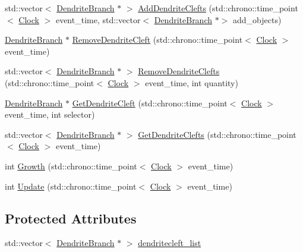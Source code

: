 \begin{DoxyCompactItemize}
\item 
std\+::vector$<$ \hyperlink{class_dendrite_branch}{Dendrite\+Branch} $\ast$ $>$ \hyperlink{class_dendrite_branch_a2ddeff41db805e414c994ac169cbcf4b}{Add\+Dendrite\+Clefts} (std\+::chrono\+::time\+\_\+point$<$ \hyperlink{universe_8h_a0ef8d951d1ca5ab3cfaf7ab4c7a6fd80}{Clock} $>$ event\+\_\+time, std\+::vector$<$ \hyperlink{class_dendrite_branch}{Dendrite\+Branch} $\ast$$>$ add\+\_\+objects)
\item 
\hyperlink{class_dendrite_branch}{Dendrite\+Branch} $\ast$ \hyperlink{class_dendrite_branch_afaca221cb4bba98e56f11b0f9e6370b5}{Remove\+Dendrite\+Cleft} (std\+::chrono\+::time\+\_\+point$<$ \hyperlink{universe_8h_a0ef8d951d1ca5ab3cfaf7ab4c7a6fd80}{Clock} $>$ event\+\_\+time)
\item 
std\+::vector$<$ \hyperlink{class_dendrite_branch}{Dendrite\+Branch} $\ast$ $>$ \hyperlink{class_dendrite_branch_acd54003e5acb9abda7d7a42f248c14b0}{Remove\+Dendrite\+Clefts} (std\+::chrono\+::time\+\_\+point$<$ \hyperlink{universe_8h_a0ef8d951d1ca5ab3cfaf7ab4c7a6fd80}{Clock} $>$ event\+\_\+time, int quantity)
\item 
\hyperlink{class_dendrite_branch}{Dendrite\+Branch} $\ast$ \hyperlink{class_dendrite_branch_a11f25ffce77011afad909acb593d2e42}{Get\+Dendrite\+Cleft} (std\+::chrono\+::time\+\_\+point$<$ \hyperlink{universe_8h_a0ef8d951d1ca5ab3cfaf7ab4c7a6fd80}{Clock} $>$ event\+\_\+time, int selector)
\item 
std\+::vector$<$ \hyperlink{class_dendrite_branch}{Dendrite\+Branch} $\ast$ $>$ \hyperlink{class_dendrite_branch_a2be44a81b4b5213947e9545400a0453c}{Get\+Dendrite\+Clefts} (std\+::chrono\+::time\+\_\+point$<$ \hyperlink{universe_8h_a0ef8d951d1ca5ab3cfaf7ab4c7a6fd80}{Clock} $>$ event\+\_\+time)
\item 
int \hyperlink{class_dendrite_branch_a4b950ef8a0856a11240d353bcfd1fba4}{Growth} (std\+::chrono\+::time\+\_\+point$<$ \hyperlink{universe_8h_a0ef8d951d1ca5ab3cfaf7ab4c7a6fd80}{Clock} $>$ event\+\_\+time)
\item 
int \hyperlink{class_dendrite_branch_a8540dfafeb5bd45f782ab31b8231b10f}{Update} (std\+::chrono\+::time\+\_\+point$<$ \hyperlink{universe_8h_a0ef8d951d1ca5ab3cfaf7ab4c7a6fd80}{Clock} $>$ event\+\_\+time)
\end{DoxyCompactItemize}
\subsection*{Protected Attributes}
\begin{DoxyCompactItemize}
\item 
std\+::vector$<$ \hyperlink{class_dendrite_branch}{Dendrite\+Branch} $\ast$ $>$ \hyperlink{class_dendrite_branch_a8015119958f7581d826dcac2c21919c9}{dendritecleft\+\_\+list}
\end{DoxyCompactItemize}
